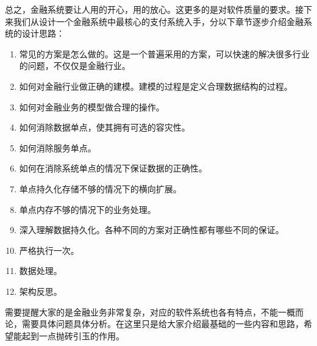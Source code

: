 总之，金融系统要让人用的开心，用的放心。这更多的是对软件质量的要求。接下来我们从设计一个金融系统中最核心的支付系统入手，分以下章节逐步介绍金融系统的设计思路：
\begin{enumerate}
    \item 常见的方案是怎么做的。这是一个普遍采用的方案，可以快速的解决很多行业的问题，不仅仅是金融行业。
    \item 如何对金融行业做正确的建模。建模的过程是定义合理数据结构的过程。
    \item 如何对金融业务的模型做合理的操作。
    \item 如何消除数据单点，使其拥有可选的容灾性。
    \item 如何消除服务单点。
    \item 如何在消除系统单点的情况下保证数据的正确性。
    \item 单点持久化存储不够的情况下的横向扩展。
    \item 单点内存不够的情况下的业务处理。
    \item 深入理解数据持久化。各种不同的方案对正确性都有哪些不同的保证。
    \item 严格执行一次。
    \item 数据处理。
    \item 架构反思。
\end{enumerate}


需要提醒大家的是金融业务非常复杂，对应的软件系统也各有特点，不能一概而论，需要具体问题具体分析。在这里只是给大家介绍最基础的一些内容和思路，希望能起到一点抛砖引玉的作用。

